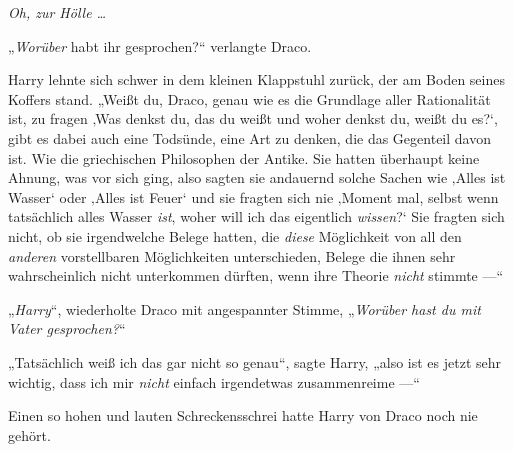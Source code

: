 \emph{Oh, zur Hölle …}

„\emph{Worüber} habt ihr gesprochen?“ verlangte Draco.

Harry lehnte sich schwer in dem kleinen Klappstuhl zurück, der am Boden seines Koffers stand.
„Weißt du, Draco, genau wie es die Grundlage aller Rationalität ist, zu fragen ‚Was denkst du, das du weißt und woher denkst du, weißt du es?‘, gibt es dabei auch eine Todsünde, eine Art zu denken, die das Gegenteil davon ist. Wie die griechischen Philosophen der Antike. Sie hatten überhaupt keine Ahnung, was vor sich ging, also sagten sie andauernd solche Sachen wie ‚Alles ist Wasser‘ oder ‚Alles ist Feuer‘ und sie fragten sich nie ‚Moment mal, selbst wenn tatsächlich alles Wasser \emph{ist}, woher will ich das eigentlich \emph{wissen}?‘ Sie fragten sich nicht, ob sie irgendwelche Belege hatten, die \emph{diese} Möglichkeit von all den \emph{anderen} vorstellbaren Möglichkeiten unterschieden, Belege die ihnen sehr wahrscheinlich nicht unterkommen dürften, wenn ihre Theorie \emph{nicht} stimmte —“

„\emph{Harry}“, wiederholte Draco mit angespannter Stimme,
„\emph{Worüber hast du mit Vater gesprochen?}“

„Tatsächlich weiß ich das gar nicht so genau“, sagte Harry, „also ist es jetzt sehr wichtig, dass ich mir \emph{nicht} einfach irgendetwas zusammenreime —“

Einen so hohen und lauten Schreckensschrei hatte Harry von Draco noch nie gehört.

